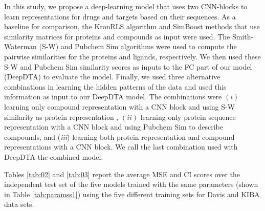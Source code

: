 \documentclass[11pt,letterpaper]{article}
\begin{document}
In this study, we propose a deep-learning model that uses two CNN-blocks to learn representations for drugs and targets based on their sequences. As a baseline for comparison, the KronRLS algorithm and SimBoost methods that use similarity matrices for proteins and compounds as input were used. The Smith-Waterman (S-W) and Pubchem Sim algorithms were used to compute the pairwise similarities for the proteins and ligands, respectively.  We then used these S-W and Pubchem Sim similarity scores as inputs to the FC part of our model (DeepDTA) to evaluate the model. Finally, we  used three alternative combinations in learning the hidden patterns of the data and used this information as input to our DeepDTA model. The combinations were $(i)$ learning only compound representation with a CNN block and using S-W similarity as protein representation , $(ii)$ learning only protein sequence representation with a CNN block and using Pubchem Sim to describe compounds, and (\textit{iii}) learning both protein representation and compound representations with a CNN block. We call the last combination used with DeepDTA the combined model.

Tables \ref{tab:02} and \ref{tab:03} report the average MSE and CI scores over the independent test set of the five models trained with the same parameters (shown in Table \ref{tab:paramss1}) using the five different training sets for Davis and KIBA data sets. 

\begin{table}[H]
\caption{The average CI and MSE scores of the test set trained on five different training sets for the Davis data set. The standard deviations are given in parenthesis. }  \label{tab:02} 
\end{table}
\end{document}
